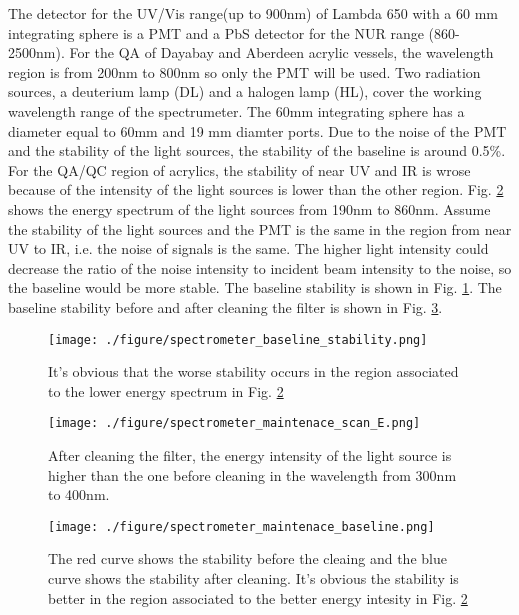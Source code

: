 The detector for the UV/Vis range(up to 900nm) of Lambda 650 with a 60 mm integrating sphere
is a PMT and a PbS detector for the NUR range (860-2500nm). For the QA of Dayabay and Aberdeen acrylic vessels, the wavelength region is from
200nm to 800nm so only the PMT will be used.
Two radiation sources, a deuterium lamp (DL) and a halogen lamp (HL), cover the working wavelength range of the spectrumeter.
The 60mm integrating sphere has a diameter equal to 60mm and 19 mm diamter ports.
Due to the noise of the PMT and the stability of the
light sources, the stability of the baseline is around 0.5\%.
For the QA/QC region of acrylics, the stability of near UV and IR is wrose because
of the intensity of the light sources is lower than the other region.
Fig. \ref{fig:spectrometer_maintenace_scan_E.png} shows the energy spectrum of the light sources from 190nm to
860nm. Assume the stability of the light sources and the PMT is the same in
the region from near UV to IR, i.e. the noise of signals is the same. The higher
light intensity could decrease the ratio of the noise intensity to incident beam intensity to the noise,
so the baseline would be more stable. The baseline stability is shown in Fig. \ref{fig:spectrometer_baseline_stability.png}.
The baseline stability before and after cleaning the filter is shown in Fig. \ref{fig:spectrometer_maintenace_baseline.png}.


\begin{figure}
    \centering
    \texttt{[image: ./figure/spectrometer\_baseline\_stability.png]}
    \caption[The spectrometer baseline stability]
{It's obvious that the worse stability occurs in the region associated to the lower energy spectrum in Fig. \ref{fig:spectrometer_maintenace_scan_E.png}}
    \label{fig:spectrometer_baseline_stability.png}
    \end{figure}


\begin{figure}
    \centering
    \texttt{[image: ./figure/spectrometer\_maintenace\_scan\_E.png]}
    \caption[The energy spectrum of the light source of Lambda 650]
{
After cleaning the filter, the energy intensity of the light source is higher than the one before cleaning in the wavelength from 300nm to 400nm.
}
    \label{fig:spectrometer_maintenace_scan_E.png}
    \end{figure}


\begin{figure}
    \centering
    \texttt{[image: ./figure/spectrometer\_maintenace\_baseline.png]}
    \caption[The spectrometer baseline stability before and after cleaing the filter]
{
The red curve shows the stability before the cleaing and the blue curve shows the stability after cleaning.
It's obvious the stability is better in the region associated to the better energy intesity in Fig. \ref{fig:spectrometer_maintenace_scan_E.png}
}
    \label{fig:spectrometer_maintenace_baseline.png}
    \end{figure}



